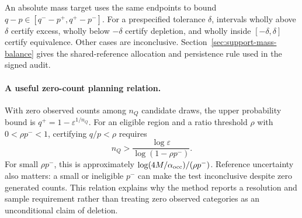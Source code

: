 An absolute mass target uses the same endpoints to bound
$q-p\in[q^- -p^+,q^+-p^-]$. For a prespecified tolerance $\delta$,
intervals wholly above $\delta$ certify excess, wholly below $-\delta$
certify depletion, and wholly inside $[-\delta,\delta]$ certify equivalence.
Other cases are inconclusive. Section~\ref{sec:support-mass-balance} gives
the shared-reference allocation and persistence rule used in the signed audit.

\paragraph{A useful zero-count planning relation.}
With zero observed counts among $n_Q$ candidate draws, the upper
probability bound is $q^+=1-\varepsilon^{1/n_Q}$.
For an eligible region and a ratio threshold $\rho$ with
$0<\rho p^-<1$, certifying $q/p<\rho$ requires
\begin{equation}
n_Q>\frac{\log\varepsilon}{\log(1-\rho p^-)}.
\label{eq:zerocount}
\end{equation}
For small $\rho p^-$, this is approximately
$\log(4M/\alpha_{\rm occ})/(\rho p^-)$.
Reference uncertainty also matters: a small or ineligible $p^-$ can make the
test inconclusive despite zero generated counts. This relation explains why
the method reports a resolution and sample requirement rather than treating
zero observed categories as an unconditional claim of deletion.

